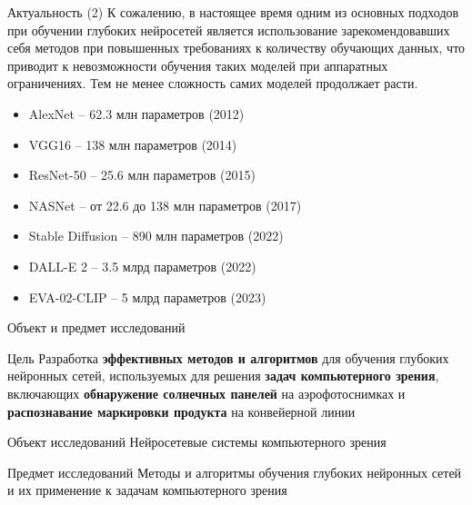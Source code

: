 \documentclass[10pt]{beamer}
\begin{document}
        \begin{frame}{Актуальность (2)}
            К сожалению, в настоящее время одним из основных подходов при обучении глубоких нейросетей является использование зарекомендовавших себя методов при повышенных требованиях к количеству обучающих данных, что приводит к невозможности обучения таких моделей при аппаратных ограничениях. Тем не менее сложность самих моделей продолжает расти.
            \newline
            \begin{itemize}
                \item AlexNet -- 62.3 млн параметров (2012)
                \item VGG16 -- 138 млн параметров (2014)
                \item ResNet-50 -- 25.6 млн параметров (2015)
                \item NASNet -- от 22.6 до 138 млн параметров (2017)
                \item Stable Diffusion -- 890 млн параметров (2022)
                \item DALL-E 2 -- 3.5 млрд параметров (2022)
                \item EVA-02-CLIP -- 5 млрд параметров (2023)
            \end{itemize}
        \end{frame}

        \begin{frame}{Объект и предмет исследований}
            \begin{block}{Цель}
                \large
                Разработка \textbf{эффективных методов и алгоритмов} для обучения глубоких нейронных сетей, используемых для решения \textbf{задач компьютерного зрения}, включающих \textbf{обнаружение солнечных панелей} на аэрофотоснимках и \textbf{распознавание маркировки продукта} на конвейерной линии
            \end{block}

            \begin{block}{Объект исследований}
                \large
                Нейросетевые системы компьютерного зрения
            \end{block}

            \begin{block}{Предмет исследований}
                \large
                Методы и алгоритмы обучения глубоких нейронных сетей и их применение к задачам компьютерного зрения
            \end{block}
        \end{frame}
\end{document}
